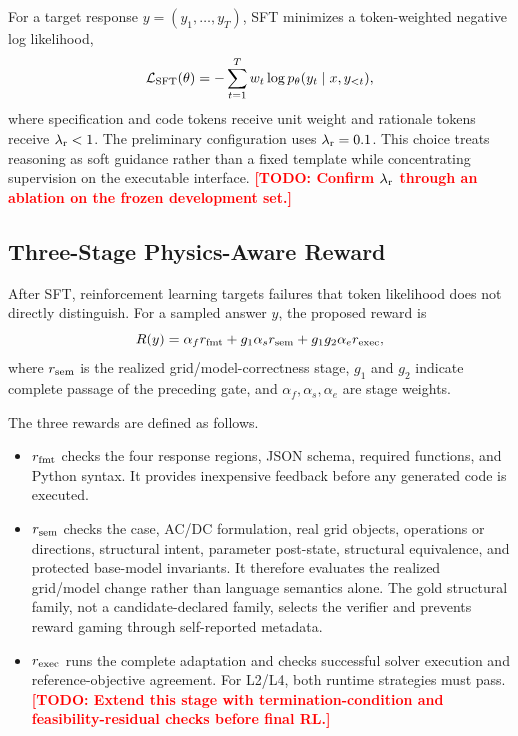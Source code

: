 \documentclass[lettersize,journal]{IEEEtran}
\newcommand{\drafttodo}[1]{\textcolor{red}{\textbf{[TODO: #1]}}}
\begin{document}
For a target response $y=(y_1,\ldots,y_T)$, SFT minimizes a token-weighted negative log likelihood,
\begin{equation}\label{eq:sft}
\mathcal L_{\rm SFT}(\theta)=-\sum_{t=1}^{T}w_t
\log p_\theta(y_t\mid x,y_{<t}),
\end{equation}
where specification and code tokens receive unit weight and rationale tokens receive $\lambda_{\rm r}<1$. The preliminary configuration uses $\lambda_{\rm r}=0.1$. This choice treats reasoning as soft guidance rather than a fixed template while concentrating supervision on the executable interface. \drafttodo{Confirm $\lambda_{\rm r}$ through an ablation on the frozen development set.}

\subsection{Three-Stage Physics-Aware Reward}
After SFT, reinforcement learning targets failures that token likelihood does not directly distinguish. For a sampled answer $y$, the proposed reward is
\begin{equation}\label{eq:reward}
R(y)=\alpha_f r_{\rm fmt}+g_1\alpha_s r_{\rm sem}
+g_1g_2\alpha_e r_{\rm exec},
\end{equation}
where $r_{\rm sem}$ is the realized grid/model-correctness stage, $g_1$ and $g_2$ indicate complete passage of the preceding gate, and $\alpha_f,\alpha_s,\alpha_e$ are stage weights.

The three rewards are defined as follows.
\begin{itemize}
  \item $r_{\rm fmt}$ checks the four response regions, JSON schema, required functions, and Python syntax. It provides inexpensive feedback before any generated code is executed.
  \item $r_{\rm sem}$ checks the case, AC/DC formulation, real grid objects, operations or directions, structural intent, parameter post-state, structural equivalence, and protected base-model invariants. It therefore evaluates the realized grid/model change rather than language semantics alone. The gold structural family, not a candidate-declared family, selects the verifier and prevents reward gaming through self-reported metadata.
  \item $r_{\rm exec}$ runs the complete adaptation and checks successful solver execution and reference-objective agreement. For L2/L4, both runtime strategies must pass. \drafttodo{Extend this stage with termination-condition and feasibility-residual checks before final RL.}
\end{itemize}
\end{document}
